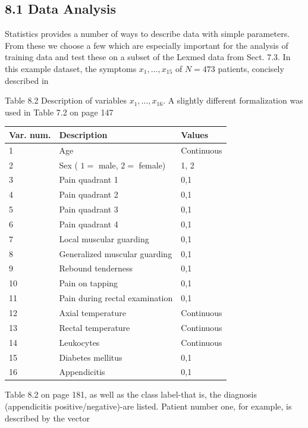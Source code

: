 \documentclass[10pt]{book}
\begin{document}
\begin{center}
\begin{enumerate}
\begin{center}
\subsection*{8.1 Data Analysis}
Statistics provides a number of ways to describe data with simple parameters. From these we choose a few which are especially important for the analysis of training data and test these on a subset of the Lexmed data from Sect. 7.3. In this example dataset, the symptoms $x_{1}, \ldots, x_{15}$ of $N=473$ patients, concisely described in

Table 8.2 Description of variables $x_{1}, \ldots, x_{16}$. A slightly different formalization was used in Table 7.2 on page 147


\begin{center}
\begin{tabular}{|l|l|l|}
\hline
Var. num. & Description & Values \\
\hline
1 & Age & Continuous \\
\hline
2 & Sex ( $1=$ male, $2=$ female) & 1, 2 \\
\hline
3 & Pain quadrant 1 & 0,1 \\
\hline
4 & Pain quadrant 2 & 0,1 \\
\hline
5 & Pain quadrant 3 & 0,1 \\
\hline
6 & Pain quadrant 4 & 0,1 \\
\hline
7 & Local muscular guarding & 0,1 \\
\hline
8 & Generalized muscular guarding & 0,1 \\
\hline
9 & Rebound tenderness & 0,1 \\
\hline
10 & Pain on tapping & 0,1 \\
\hline
11 & Pain during rectal examination & 0,1 \\
\hline
12 & Axial temperature & Continuous \\
\hline
13 & Rectal temperature & Continuous \\
\hline
14 & Leukocytes & Continuous \\
\hline
15 & Diabetes mellitus & 0,1 \\
\hline
16 & Appendicitis & 0,1 \\

\hline
\end{tabular}
\end{center}

Table 8.2 on page 181, as well as the class label-that is, the diagnosis (appendicitis positive/negative)-are listed. Patient number one, for example, is described by the vector


\end{center}
\end{enumerate}
\end{center}
\end{document}
